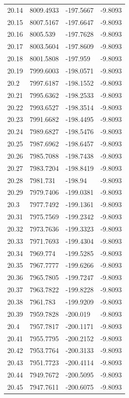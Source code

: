 \begin{table}[H]
\begin{tabular}{llll}
20.14 & 8009.4933 & -197.5667 & -9.8093 \\
20.15 & 8007.5167 & -197.6647 & -9.8093 \\
20.16 & 8005.539 & -197.7628 & -9.8093 \\
20.17 & 8003.5604 & -197.8609 & -9.8093 \\
20.18 & 8001.5808 & -197.959 & -9.8093 \\
20.19 & 7999.6003 & -198.0571 & -9.8093 \\
20.2 & 7997.6187 & -198.1552 & -9.8093 \\
20.21 & 7995.6362 & -198.2533 & -9.8093 \\
20.22 & 7993.6527 & -198.3514 & -9.8093 \\
20.23 & 7991.6682 & -198.4495 & -9.8093 \\
20.24 & 7989.6827 & -198.5476 & -9.8093 \\
20.25 & 7987.6962 & -198.6457 & -9.8093 \\
20.26 & 7985.7088 & -198.7438 & -9.8093 \\
20.27 & 7983.7204 & -198.8419 & -9.8093 \\
20.28 & 7981.731 & -198.94 & -9.8093 \\
20.29 & 7979.7406 & -199.0381 & -9.8093 \\
20.3 & 7977.7492 & -199.1361 & -9.8093 \\
20.31 & 7975.7569 & -199.2342 & -9.8093 \\
20.32 & 7973.7636 & -199.3323 & -9.8093 \\
20.33 & 7971.7693 & -199.4304 & -9.8093 \\
20.34 & 7969.774 & -199.5285 & -9.8093 \\
20.35 & 7967.7777 & -199.6266 & -9.8093 \\
20.36 & 7965.7805 & -199.7247 & -9.8093 \\
20.37 & 7963.7822 & -199.8228 & -9.8093 \\
20.38 & 7961.783 & -199.9209 & -9.8093 \\
20.39 & 7959.7828 & -200.019 & -9.8093 \\
20.4 & 7957.7817 & -200.1171 & -9.8093 \\
20.41 & 7955.7795 & -200.2152 & -9.8093 \\
20.42 & 7953.7764 & -200.3133 & -9.8093 \\
20.43 & 7951.7723 & -200.4114 & -9.8093 \\
20.44 & 7949.7672 & -200.5095 & -9.8093 \\
20.45 & 7947.7611 & -200.6075 & -9.8093 \\

\end{tabular}
\end{table}
